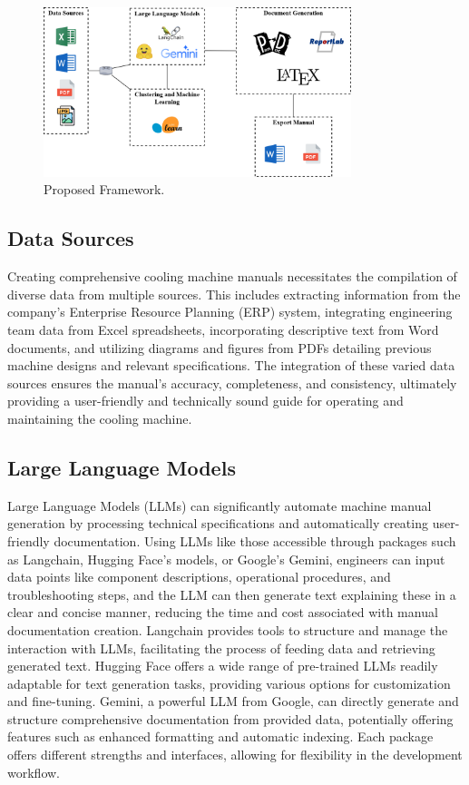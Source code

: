 \documentclass{article}%
\begin{document}
\begin{figure}[h!]%
\centering%
\includegraphics[width=0.8\textwidth]{images/Tools.png}%
\caption{Proposed Framework.}%
\end{figure}

%
\subsection{Data Sources}%
\label{subsec:DataSources}%
Creating comprehensive cooling machine manuals necessitates the compilation of diverse data from multiple sources.  This includes extracting information from the company's Enterprise Resource Planning (ERP) system, integrating engineering team data from Excel spreadsheets, incorporating descriptive text from Word documents, and utilizing diagrams and figures from PDFs detailing previous machine designs and relevant specifications.\newline%
The integration of these varied data sources ensures the manual's accuracy, completeness, and consistency, ultimately providing a user{-}friendly and technically sound guide for operating and maintaining the cooling machine.

%
\subsection{Large Language Models}%
\label{subsec:LargeLanguageModels}%
Large Language Models (LLMs) can significantly automate machine manual generation by processing technical specifications and automatically creating user{-}friendly documentation.  Using LLMs like those accessible through packages such as Langchain, Hugging Face's models, or Google's Gemini, engineers can input data points like component descriptions, operational procedures, and troubleshooting steps, and the LLM can then generate text explaining these in a clear and concise manner, reducing the time and cost associated with manual documentation creation.\newline%
Langchain provides tools to structure and manage the interaction with LLMs, facilitating the process of feeding data and retrieving generated text. Hugging Face offers a wide range of pre{-}trained LLMs readily adaptable for text generation tasks, providing various options for customization and fine{-}tuning. Gemini, a powerful LLM from Google, can directly generate and structure comprehensive documentation from provided data, potentially offering features such as enhanced formatting and automatic indexing.  Each package offers different strengths and interfaces, allowing for flexibility in the development workflow.
\end{document}
